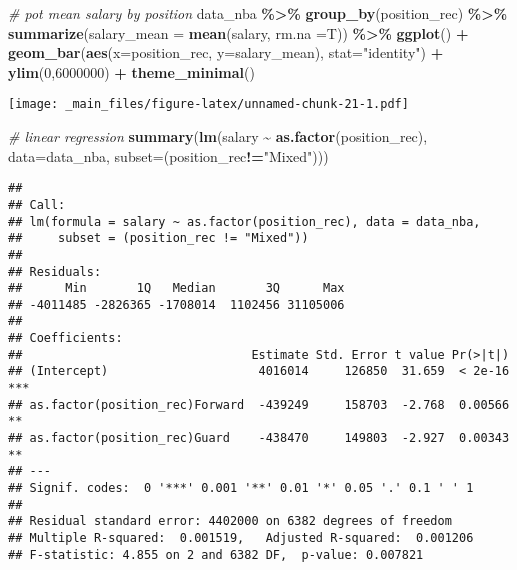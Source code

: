 \documentclass[
]{book}
\newenvironment{Shaded}{\begin{snugshade}}{\end{snugshade}}
\newcommand{\AttributeTok}[1]{\textcolor[rgb]{0.13,0.29,0.53}{#1}}
\newcommand{\CommentTok}[1]{\textcolor[rgb]{0.56,0.35,0.01}{\textit{#1}}}
\newcommand{\DecValTok}[1]{\textcolor[rgb]{0.00,0.00,0.81}{#1}}
\newcommand{\FunctionTok}[1]{\textcolor[rgb]{0.13,0.29,0.53}{\textbf{#1}}}
\newcommand{\NormalTok}[1]{#1}
\newcommand{\SpecialCharTok}[1]{\textcolor[rgb]{0.81,0.36,0.00}{\textbf{#1}}}
\newcommand{\StringTok}[1]{\textcolor[rgb]{0.31,0.60,0.02}{#1}}
\begin{document}
\begin{Shaded}
\begin{Highlighting}[]
\CommentTok{\# pot mean salary by position}
\NormalTok{data\_nba }\SpecialCharTok{\%\textgreater{}\%} \FunctionTok{group\_by}\NormalTok{(position\_rec) }\SpecialCharTok{\%\textgreater{}\%}
  \FunctionTok{summarize}\NormalTok{(}\AttributeTok{salary\_mean =} \FunctionTok{mean}\NormalTok{(salary, }\AttributeTok{rm.na =}\NormalTok{T)) }\SpecialCharTok{\%\textgreater{}\%}
  \FunctionTok{ggplot}\NormalTok{() }\SpecialCharTok{+}
  \FunctionTok{geom\_bar}\NormalTok{(}\FunctionTok{aes}\NormalTok{(}\AttributeTok{x=}\NormalTok{position\_rec, }\AttributeTok{y=}\NormalTok{salary\_mean), }\AttributeTok{stat=}\StringTok{"identity"}\NormalTok{) }\SpecialCharTok{+}
  \FunctionTok{ylim}\NormalTok{(}\DecValTok{0}\NormalTok{,}\DecValTok{6000000}\NormalTok{) }\SpecialCharTok{+}
  \FunctionTok{theme\_minimal}\NormalTok{()}
\end{Highlighting}
\end{Shaded}

\texttt{[image: \_main\_files/figure-latex/unnamed-chunk-21-1.pdf]}

\begin{Shaded}
\begin{Highlighting}[]
\CommentTok{\# linear regression}
\FunctionTok{summary}\NormalTok{(}\FunctionTok{lm}\NormalTok{(salary }\SpecialCharTok{\textasciitilde{}} \FunctionTok{as.factor}\NormalTok{(position\_rec), }\AttributeTok{data=}\NormalTok{data\_nba, }\AttributeTok{subset=}\NormalTok{(position\_rec}\SpecialCharTok{!=}\StringTok{"Mixed"}\NormalTok{)))}
\end{Highlighting}
\end{Shaded}

\begin{verbatim}
## 
## Call:
## lm(formula = salary ~ as.factor(position_rec), data = data_nba, 
##     subset = (position_rec != "Mixed"))
## 
## Residuals:
##      Min       1Q   Median       3Q      Max 
## -4011485 -2826365 -1708014  1102456 31105006 
## 
## Coefficients:
##                                Estimate Std. Error t value Pr(>|t|)    
## (Intercept)                     4016014     126850  31.659  < 2e-16 ***
## as.factor(position_rec)Forward  -439249     158703  -2.768  0.00566 ** 
## as.factor(position_rec)Guard    -438470     149803  -2.927  0.00343 ** 
## ---
## Signif. codes:  0 '***' 0.001 '**' 0.01 '*' 0.05 '.' 0.1 ' ' 1
## 
## Residual standard error: 4402000 on 6382 degrees of freedom
## Multiple R-squared:  0.001519,   Adjusted R-squared:  0.001206 
## F-statistic: 4.855 on 2 and 6382 DF,  p-value: 0.007821
\end{verbatim}
\end{document}
